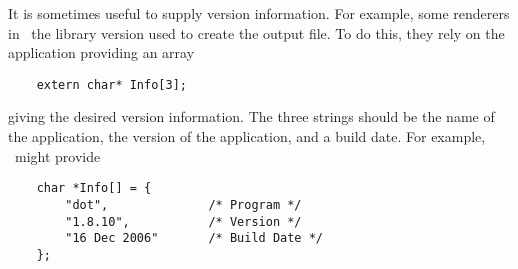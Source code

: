 It is sometimes useful to supply version information.
For example, some renderers in \gviz\ the library version used
to create the output file. To do this, they rely on 
the application providing an array 
\begin{verbatim}
    extern char* Info[3];
\end{verbatim}
giving the desired version information.
The three strings should be the name of the application, the version
of the application, and a build date. For example, \dot\ might provide
\begin{verbatim}
    char *Info[] = {
        "dot",              /* Program */
        "1.8.10",           /* Version */
        "16 Dec 2006"       /* Build Date */
    };
\end{verbatim}

